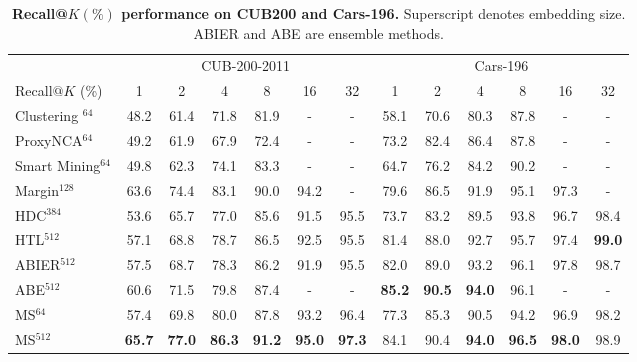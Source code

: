 \documentclass[10pt,twocolumn,letterpaper]{article}
\newcommand{\tablestyle}[2]{\setlength{\tabcolsep}{#1}\renewcommand{\arraystretch}{#2}\centering\footnotesize}
\begin{document}
\begin{table*}[t]
    \tablestyle{10pt}{1.1}
	\begin{center}
		\begin{tabular}{l|cccccc|cccccc}
			& \multicolumn{6}{c}{CUB-200-2011}  &\multicolumn{6}{c}{Cars-196}\\
			Recall$@K$  (\%) & 1 & 2 & 4 & 8 & 16 & 32 & 1 & 2 & 4 & 8 & 16 & 32\\ \shline
			{Clustering $^{64}$\cite{struct-clustering}}  &48.2 & 61.4 & 71.8 & 81.9 & - & - & 58.1 & 70.6 & 80.3 & 87.8 & - & -\\ 
			{ProxyNCA$^{64}$ \cite{proxyloss}} &49.2 & 61.9 & 67.9 & 72.4 & - & - & 73.2 & 82.4 & 86.4 & 87.8 & - & -\\
			{Smart Mining$^{64}$ \cite{smart-mining}} &49.8 & 62.3 & 74.1 & 83.3 & - & - & 64.7 & 76.2 & 84.2 & 90.2 & - & -\\ 
			{Margin$^{128}$ \cite{sampling}}& 63.6& 74.4& 83.1& 90.0& 94.2 & - & 79.6& 86.5& 91.9& 95.1& 97.3 & - \\
			HDC$^{384}$ \cite{struct-clustering}& 53.6 & 65.7 & 77.0 & 85.6 & 91.5 & 95.5 & 73.7 & 83.2 & 89.5 & 93.8 & 96.7 & 98.4\\ 
			HTL$^{512}$ \cite{HTL} & 57.1& 68.8& 78.7& 86.5& 92.5& 95.5 & 81.4& 88.0& 92.7& 95.7& 97.4& \bf{99.0} \\\hline
			ABIER$^{512}$ \cite{bier}&57.5 &68.7 &78.3 &86.2 &91.9 &95.5 &82.0 &89.0 &93.2 &96.1 &97.8 &98.7\\
			ABE$^{512}$ \cite{Kim_2018_ECCV}  & 60.6 & 71.5 & 79.8 & 87.4 & - & - & \bf 85.2 & \textbf{90.5} & \textbf{94.0} & 96.1 & - & -\\
\hline 
			MS$^{64}$& 57.4& 69.8&  80.0&  87.8& 93.2& 96.4 & 77.3& 85.3& 90.5& 94.2& 96.9& 98.2\\ 
			MS$^{512}$& \bf65.7& \bf77.0& \bf86.3& \bf91.2& \bf95.0& \bf97.3& 84.1& 90.4 & \bf94.0& \bf96.5& \bf98.0& 98.9\\
\end{tabular}
		\vspace{3pt}
		\caption{\textbf{Recall@$K(\%)$ performance on CUB200 and Cars-196.} Superscript denotes embedding size. ABIER \cite{bier} and ABE \cite{Kim_2018_ECCV} are ensemble methods.}
		\label{cub-car-table}
		\vspace{-15pt}
	\end{center}
\end{table*}
\end{document}
